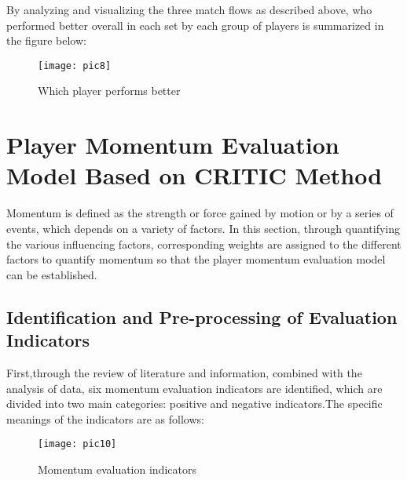 \documentclass[12pt]{article}  %
\begin{document}
By analyzing and visualizing the three match flows as described above, who performed better overall in each set by each group of players is summarized in the figure below:
\begin{figure}[htbp]  %
	\centering  %
	\texttt{[image: pic8]} %
	\caption{Which player performs better}  
	\label{pic8}
\end{figure}

\section{Player Momentum Evaluation Model Based on CRITIC Method}
Momentum is defined as the strength or force gained by motion or by a series of events, which depends on a variety of factors. In this section, through quantifying the various influencing factors, corresponding weights are assigned to the different factors to quantify momentum so that the player momentum evaluation model can be established.

\subsection{Identification and Pre-processing of Evaluation Indicators}
First,through the review of literature and information, combined with the analysis of data, six momentum evaluation indicators are identified, which are divided into two main categories: positive and negative indicators.The specific meanings of the indicators are as follows:

\begin{figure}[htbp]  %
	\centering  %
	\texttt{[image: pic10]} %
	\caption{Momentum evaluation indicators}  
	\label{pic10}
\end{figure}
\vspace{-0.5cm}
\end{document}
